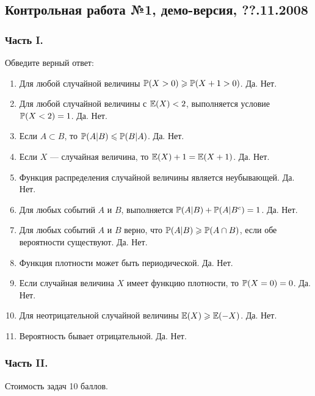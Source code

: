 \subsection{Контрольная работа №1, демо-версия, ??.11.2008}

\subsubsection*{Часть I.}

Обведите верный ответ:

\begin{enumerate}
\item Для любой случайной величины $\P(X>0)\ge \P(X+1>0)$. Да. Нет.
\item Для любой случайной величины с $\E(X)<2$, выполняется условие $\P(X<2)=1$. Да. Нет.
\item Если $A\subset B$, то $\P(A|B)\le \P(B|A)$. Да. Нет.
\item Если  $X$ — случайная величина, то $\E(X)+1=\E(X+1)$. Да. Нет.
\item Функция распределения случайной величины является неубывающей. Да. Нет.
\item Для любых событий $A$ и $B$, выполняется $\P(A|B)+\P(A|B^{c})=1$. Да. Нет.
\item Для любых событий  $A$  и  $B$  верно, что $\P(A|B)\ge \P(A\cap
B)$, если обе вероятности существуют. Да. Нет.
\item Функция плотности может быть периодической. Да. Нет.
\item Если случайная величина $X$ имеет функцию плотности, то $\P(X=0)=0$. Да. Нет.
\item Для неотрицательной случайной величины $\E(X)\ge \E(-X)$. Да.
Нет.
\item Вероятность бывает отрицательной. Да. Нет.
\end{enumerate}

\subsubsection*{Часть II.}

Стоимость задач 10 баллов.

